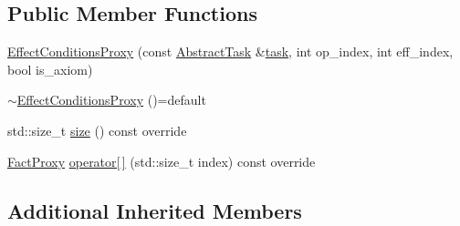 \subsection*{Public Member Functions}
\begin{DoxyCompactItemize}
\item 
\hyperlink{classEffectConditionsProxy_a25b9e1d6b6683e4d564a2ae0df90f39b}{Effect\-Conditions\-Proxy} (const \hyperlink{classAbstractTask}{Abstract\-Task} \&\hyperlink{classConditionsProxy_a8e8c904bd5dc370a7239ec7495dc0dfe}{task}, int op\-\_\-index, int eff\-\_\-index, bool is\-\_\-axiom)
\item 
\hyperlink{classEffectConditionsProxy_a0836d4d793b2138ad1dac4d328f4345a}{$\sim$\-Effect\-Conditions\-Proxy} ()=default
\item 
std\-::size\-\_\-t \hyperlink{classEffectConditionsProxy_af447849d62079e622be08a68df7dab14}{size} () const override
\item 
\hyperlink{classFactProxy}{Fact\-Proxy} \hyperlink{classEffectConditionsProxy_a9f41ffe872d125b643591f050e8ca69a}{operator\mbox{[}$\,$\mbox{]}} (std\-::size\-\_\-t index) const override
\end{DoxyCompactItemize}
\subsection*{Additional Inherited Members}


